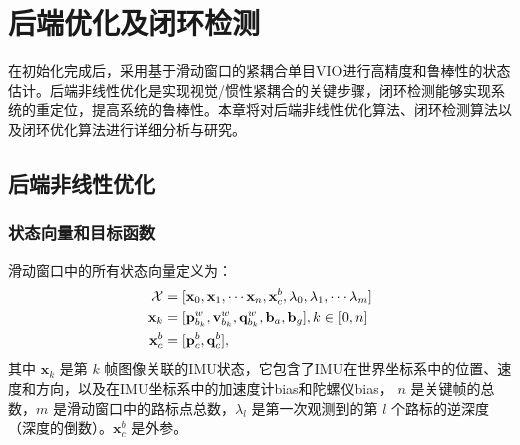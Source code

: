 \chapter{后端优化及闭环检测}
\label{chap:4}
在初始化完成后，采用基于滑动窗口的紧耦合单目VIO进行高精度和鲁棒性的状态估计。后端非线性优化是实现视觉/惯性紧耦合的关键步骤，闭环检测能够实现系统的重定位，提高系统的鲁棒性。本章将对后端非线性优化算法、闭环检测算法以及闭环优化算法进行详细分析与研究。
\section{后端非线性优化}
\subsection{状态向量和目标函数}
滑动窗口中的所有状态向量定义为：
\begin{equation}
\label{eqn:4.1}{\tiny }
\begin{split}
\mathcal{X}&=[\mathbf{x}_0,\mathbf{x}_1,\cdots\mathbf{x}_n,\mathbf{x}_c^b,\lambda_0,\lambda_1,\cdots\lambda_m] \\
\mathbf{x}_k&=[\mathbf{p}_{b_k}^w,\mathbf{v}_{b_k}^w,\mathbf{q}_{b_k}^w,\mathbf{b}_a,\mathbf{b}_g],k\in[0,n] \\
\mathbf{x}_c^b&=[\mathbf{p}_c^b,\mathbf{q}_c^b],
\end{split}
\end{equation}
其中 $\mathbf{x}_k $ 是第 $k$ 帧图像关联的IMU状态，它包含了IMU在世界坐标系中的位置、速度和方向，以及在IMU坐标系中的加速度计bias和陀螺仪bias， $n$ 是关键帧的总数，$m$ 是滑动窗口中的路标点总数，$\lambda_l$ 是第一次观测到的第 $l$ 个路标的逆深度（深度的倒数）。$\mathbf{x}_c^b $ 是外参。

